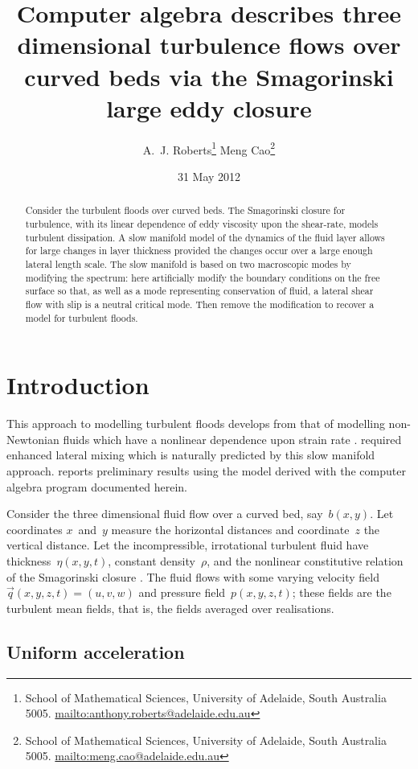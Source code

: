 \documentclass[12pt,a5paper]{article}
\title{Computer algebra describes three dimensional turbulence flows over curved beds via the Smagorinski large eddy closure}
\author{A.~J. Roberts\thanks{School of Mathematical Sciences,
University of Adelaide, South Australia 5005.  \protect\url{mailto:anthony.roberts@adelaide.edu.au}}
\qquad 
Meng Cao\thanks{School of Mathematical Sciences,
University of Adelaide, South Australia 5005.  \protect\url{mailto:meng.cao@adelaide.edu.au}}}
\date{31 May 2012}
\begin{document}
    
\maketitle
    
\begin{abstract}
Consider the turbulent floods over curved beds.  The Smagorinski closure for turbulence, with its linear dependence of eddy viscosity upon the shear-rate, models turbulent dissipation.  A slow manifold model of the dynamics of the fluid layer allows for large changes in layer thickness provided the changes occur over a large enough lateral length scale.  The slow manifold is based on two macroscopic modes by modifying the spectrum: here artificially modify the boundary conditions on the free surface so that, as well as a mode representing conservation of fluid, a lateral shear flow with slip is a neutral critical mode.  Then remove the modification to recover a model for turbulent floods.  \end{abstract}

\tableofcontents




\section{Introduction}

This approach to modelling turbulent floods develops from that of modelling non-Newtonian fluids which have a nonlinear dependence upon strain rate \cite[]{Roberts07a, Roberts07b}. \cite{Bijvelds99} required enhanced lateral mixing which is naturally predicted by this slow manifold approach. \cite{Roberts08f} reports preliminary results using the model derived with the computer algebra program documented herein.

Consider the three dimensional fluid flow over a curved bed, say~$b(x,y)$.  Let coordinates $x$~and~$y$ measure the horizontal distances and coordinate~$z$ the vertical distance. Let the incompressible, irrotational turbulent fluid have thickness~$\eta(x,y,t)$, constant density~$\rho$, and the nonlinear constitutive relation of the Smagorinski closure \cite[e.g.]{Kim02, Marstop06, Ozgokmen07}.  The fluid flows with some varying velocity field $\vec q(x,y,z,t)=(u,v,w)$ and pressure field~$p(x,y,z,t)$; these fields are the turbulent mean fields, that is, the fields averaged over realisations.


\subsection{Uniform acceleration}
\end{document}
